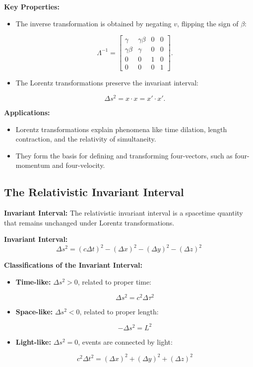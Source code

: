 \documentclass{article}
\newcommand{\eqbox}[1]{\begin{tcolorbox}[colback=gray!10] #1 \end{tcolorbox}}
\newcommand{\conceptbox}[1]{\begin{tcolorbox}[colback=blue!10] #1 \end{tcolorbox}}
\begin{document}
\conceptbox{
\textbf{Key Properties:}
\begin{itemize}
    \item The inverse transformation is obtained by negating \( v \), flipping the sign of \( \beta \):
    \eqbox{
    \[
    \Lambda^{-1} = \begin{bmatrix}
    \gamma & \gamma \beta & 0 & 0 \\
    \gamma \beta & \gamma & 0 & 0 \\
    0 & 0 & 1 & 0 \\
    0 & 0 & 0 & 1
    \end{bmatrix}.
    \]
    }
    \item The Lorentz transformations preserve the invariant interval:
    \eqbox{
    \[
    \Delta s^2 = x \cdot x = x'\cdot x'.
    \]
    }
\end{itemize}
}

\conceptbox{
\textbf{Applications:}
\begin{itemize}
    \item Lorentz transformations explain phenomena like time dilation, length contraction, and the relativity of simultaneity.
    \item They form the basis for defining and transforming four-vectors, such as four-momentum and four-velocity.
\end{itemize}
}


\subsection{The Relativistic Invariant Interval}
\conceptbox{
\textbf{Invariant Interval:}
The relativistic invariant interval is a spacetime quantity that remains unchanged under Lorentz transformations.
}
\eqbox{
\textbf{Invariant Interval:}
\[
\Delta s^2 = (c\Delta t)^2 - (\Delta x)^2 - (\Delta y)^2 - (\Delta z)^2
\]}
\conceptbox{
\textbf{Classifications of the Invariant Interval:}
\begin{itemize}
    \item \textbf{Time-like:} \( \Delta s^2 > 0 \), related to proper time:
    \eqbox{
    \[
    \Delta s^2 = c^2 \Delta \tau^2
    \]
    }
    \item \textbf{Space-like:} \( \Delta s^2 < 0 \), related to proper length:
    \eqbox{
    \[
    -\Delta s^2 = L^2
    \]
    }
    \item \textbf{Light-like:} \( \Delta s^2 = 0 \), events are connected by light:
    \eqbox{
    \[
    c^2\Delta t^2 = (\Delta x)^2 + (\Delta y)^2 + (\Delta z)^2
    \]
    }
\end{itemize}
}
\end{document}
